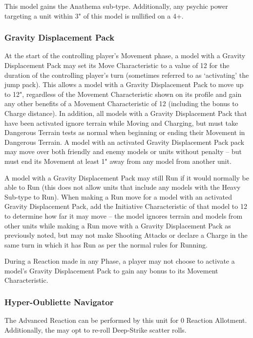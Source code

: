 This model gains the Anathema sub-type. Additionally, any psychic power targeting a unit within 3" of this model is nullified on a 4+. \\

\subsubsection{Gravity Displacement Pack} \label{Gravity Displacement Pack}

At the start of the controlling player’s Movement phase, a model with a Gravity Displacement Pack may set its Move Characteristic to a value of 12 for the duration of the controlling player’s turn (sometimes referred to as ‘activating’ the jump pack). This allows a model with a Gravity Displacement Pack to move up to 12", regardless of the Movement Characteristic shown on its profile and gain any other benefits of a Movement Characteristic of 12 (including the bonus to Charge distance). In addition, all models with a Gravity Displacement Pack that have been activated ignore terrain while Moving and Charging, but must take Dangerous Terrain tests as normal when beginning or ending their Movement in Dangerous Terrain. A model with an activated Gravity Displacement Pack pack may move over both friendly and enemy models or units without penalty – but must end its Movement at least 1" away from any model from another unit.

A model with a Gravity Displacement Pack may still Run if it would normally be able to Run (this does not allow units that include any models with the Heavy Sub-type to Run). When making a Run move for a model with an activated Gravity Displacement Pack, add the Initiative Characteristic of that model to 12 to determine how far it may move – the model ignores terrain and models from other units while making a Run move with a Gravity Displacement Pack as previously noted, but may not make Shooting Attacks or declare a Charge in the same turn in which it has Run as per the normal rules for Running.

During a Reaction made in any Phase, a player may not choose to activate a model’s Gravity Displacement Pack to gain any bonus to its Movement Characteristic.

\subsubsection{Hyper-Oubliette Navigator} \label{Hyper-Oubliette Navigator}

The  Advanced Reaction can be performed by this unit for 0 Reaction Allotment. Additionally, the may opt to re-roll Deep-Strike scatter rolls.

